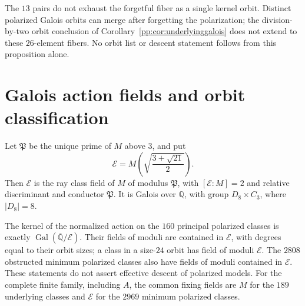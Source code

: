The $13$ pairs do not exhaust the forgetful fiber as a single kernel
orbit. Distinct polarized Galois orbits can merge after forgetting
the polarization; the division-by-two orbit conclusion of
Corollary~\ref{pp:cor:underlyinggalois} does not extend to these
$26$-element fibers. No orbit list or descent statement follows
from this proposition alone.

\section{Galois action fields and orbit classification}
\begin{theorem}
\label{pp:thm:quotientrayfield}
Let $\mathfrak P$ be the unique prime of $M$ above $3$, and put
\[
 \mathcal E=M\left(\sqrt{\frac{3+\sqrt{21}}2}\right).
\]
Then $\mathcal E$ is the ray class field of $M$ of modulus $\mathfrak P$,
with $[\mathcal E:M]=2$ and relative discriminant and conductor
$\mathfrak P$. It is Galois over $\mathbb Q$, with group
$D_8\times C_3$, where $|D_8|=8$.

The kernel of the normalized action on the $160$ principal polarized
classes is exactly $\operatorname{Gal}(\overline{\mathbb Q}/\mathcal E)$.
Their fields of moduli are contained in $\mathcal E$, with degrees
equal to their orbit sizes; a class in a size-$24$ orbit has field of
moduli $\mathcal E$. The $2808$ obstructed minimum polarized classes
also have fields of moduli contained in $\mathcal E$.
These statements do not assert effective descent of polarized models.
For the complete finite family, including $A$, the common fixing fields
are $M$ for the $189$ underlying classes and $\mathcal E$ for the
$2969$ minimum polarized classes.
\end{theorem}
